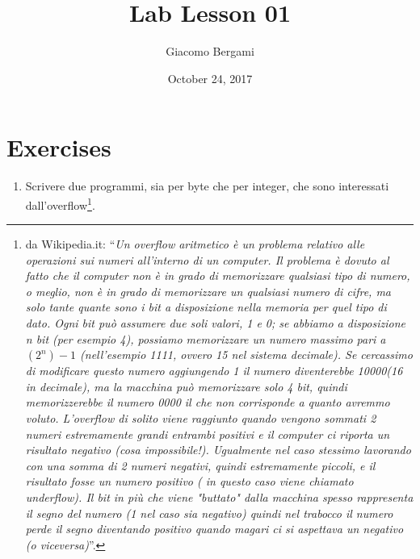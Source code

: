 \documentclass[]{scrartcl}
\title{Lab Lesson 01}
\date{October 24, 2017}
\author{Giacomo Bergami}
\begin{document}
\maketitle
\section*{Exercises}

\begin{enumerate}
\item Scrivere due programmi, sia per byte che per integer, che sono interessati dall'overflow\footnote{da Wikipedia.it: ``\textit{Un overflow aritmetico è un problema relativo alle operazioni sui numeri all'interno di un computer. Il problema è dovuto al fatto che il computer non è in grado di memorizzare qualsiasi tipo di numero, o meglio, non è in grado di memorizzare un qualsiasi numero di cifre, ma solo tante quante sono i bit a disposizione nella memoria per quel tipo di dato. Ogni bit può assumere due soli valori, 1 e 0; se abbiamo a disposizione n bit (per esempio 4), possiamo memorizzare un numero massimo pari a $(2^n)-1$ (nell'esempio 1111, ovvero 15 nel sistema decimale). Se cercassimo di modificare questo numero aggiungendo 1 il numero diventerebbe 10000(16 in decimale), ma la macchina può memorizzare solo 4 bit, quindi memorizzerebbe il numero 0000 il che non corrisponde a quanto avremmo voluto. L'overflow di solito viene raggiunto quando vengono sommati 2 numeri estremamente grandi entrambi positivi e il computer ci riporta un risultato negativo (cosa impossibile!). Ugualmente nel caso stessimo lavorando con una somma di 2 numeri negativi, quindi estremamente piccoli, e il risultato fosse un numero positivo ( in questo caso viene chiamato underflow). Il bit in più che viene "buttato" dalla macchina spesso rappresenta il segno del numero (1 nel caso sia negativo) quindi nel trabocco il numero perde il segno diventando positivo quando magari ci si aspettava un negativo (o viceversa)}''.}.


\end{enumerate}
\end{document}
